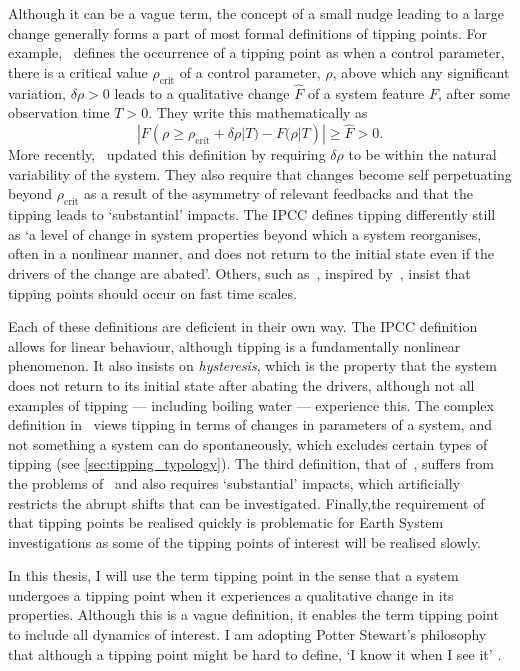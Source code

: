 Although it can be a vague term, the concept of a small nudge leading to a large change generally forms a part of most formal definitions of tipping points.
For example,~\cite{Lenton2008} defines the occurrence of a tipping
point as when a control parameter, there is a critical value $\rho_{\mathrm{crit}}$ of a control parameter, $\rho$, above which any significant variation, $\delta \rho > 0$ leads to a qualitative change
$\hat{F}$ of a system feature $F$, after some observation time $T > 0$. They write this mathematically as
\begin{equation}
  \label{eq:lenton_tipping_definition}
  |F(\rho \geq \rho_{\mathrm{crit}} + \delta \rho | T) - F(\rho|T)| \geq \hat{F} > 0.
\end{equation}
More recently,~\cite{ArmstrongMcKay2022} updated this definition by requiring $\delta \rho$ to be within the natural variability of the system. They also require that changes become self perpetuating
beyond $\rho_{\mathrm{crit}}$ as a result of the asymmetry of relevant feedbacks and that the tipping leads to `substantial' impacts. The IPCC \parencite{AR6} defines tipping differently still
as `a level of change in system properties beyond which a system reorganises, often in a nonlinear manner, and does not return to the initial state even if the drivers of the change are abated'.
Others, such as~\cite{Wang2023}, inspired by~\cite{Kopp2016}, insist that tipping points should occur on fast time scales.

Each of these definitions are deficient in their own way. The IPCC definition allows for linear behaviour, although tipping is a fundamentally nonlinear phenomenon. It also insists on \emph{hysteresis},
which is the property that the system does not return to its initial state after abating the drivers, although not all examples of tipping --- including boiling water --- experience this.
The complex definition in~\cite{Lenton2008} views tipping in terms of changes in parameters of a system, and not something a system can do spontaneously, which excludes certain types of
tipping (see \cref{sec:tipping_typology}). The third definition, that of~\cite{ArmstrongMcKay2022}, suffers from the problems of~\cite{Lenton2008} and also requires `substantial' impacts, which
artificially restricts the abrupt shifts that can be investigated. Finally,the requirement of~\cite{Wang2023} that tipping points be realised quickly is problematic for Earth System investigations
as some of the tipping points of interest will be realised slowly.

In this thesis, I will use the term tipping point in the sense that a system undergoes a tipping point when it experiences a qualitative change in its properties. Although this is a vague definition,
it enables the term tipping point to include all dynamics of interest. I am adopting Potter Stewart's philosophy that although a tipping point might be hard to define,
`I know it when I see it' \parencite{Stewart1964}.

